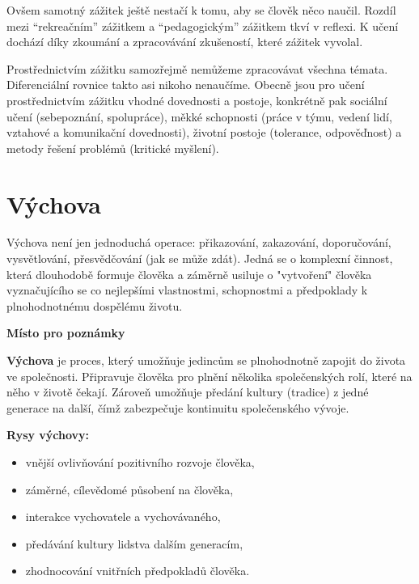 \documentclass[a4paper,12pt]{report}
\begin{document}
Ovšem samotný zážitek ještě nestačí k tomu, aby se člověk něco naučil. Rozdíl mezi ``rekreačním'' zážitkem a ``pedagogickým'' zážitkem tkví v reflexi. K učení dochází díky zkoumání a zpracovávání zkušeností, které zážitek vyvolal.

Prostřednictvím zážitku samozřejmě nemůžeme zpracovávat všechna témata. Diferenciální rovnice takto asi nikoho nenaučíme. Obecně jsou pro učení prostřednictvím zážitku vhodné dovednosti a postoje, konkrétně pak sociální učení (sebepoznání, spolupráce), měkké schopnosti (práce v týmu, vedení lidí, vztahové a komunikační dovednosti), životní postoje (tolerance, odpověďnost) a metody řešení problémů (kritické myšlení).

\newpage
\section[Výchova]{Výchova}\pagelogos
Výchova není jen jednoduchá operace: přikazování, zakazování, doporučování, vysvětlování, přesvědčování (jak se může zdát). Jedná se o komplexní činnost, která dlouhodobě formuje člověka a záměrně usiluje o "vytvoření" člověka vyznačujícího se co nejlepšími vlastnostmi, schopnostmi a předpoklady k plnohodnotnému dospělému životu.

\begin{samepage}\begin{flushleft}
\end{flushleft}
\textbf{Místo pro poznámky}
\vspace{5cm}\pagelogos
\end{samepage}

\textbf{Výchova} je proces, který umožňuje jedincům se plnohodnotně zapojit do života ve společnosti. Připravuje člověka pro plnění několika společenských rolí, které na něho v životě čekají. Zároveň umožňuje předání kultury (tradice) z jedné generace na další, čímž zabezpečuje kontinuitu společenského vývoje.

\textbf{Rysy výchovy:}
\begin{itemize}
 \item vnější ovlivňování pozitivního rozvoje člověka,
 \item záměrné, cílevědomé působení na člověka,
 \item interakce vychovatele a vychovávaného,
 \item předávání kultury lidstva dalším generacím,
 \item zhodnocování vnitřních předpokladů člověka.
\end{itemize}
\end{document}
